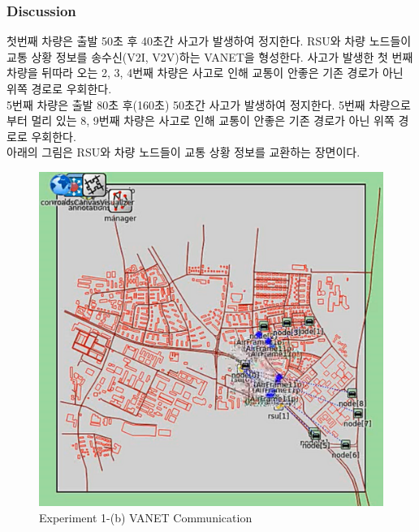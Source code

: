         \subsubsection*{Discussion}
            첫번째 차량은 출발 50초 후 40초간 사고가 발생하여 정지한다. RSU와 차량 노드들이 교통 상황 정보를 송수신(V2I, V2V)하는 VANET을 형성한다. 사고가 발생한 첫 번째 차량을 뒤따라 오는 2, 3, 4번째 차량은 사고로 인해 교통이 안좋은 기존 경로가 아닌 위쪽 경로로 우회한다. \\
            5번째 차량은 출발 80초 후(160초) 50초간 사고가 발생하여 정지한다. 5번째 차량으로부터 멀리 있는 8, 9번째 차량은 사고로 인해 교통이 안좋은 기존 경로가 아닌 위쪽 경로로 우회한다. \\
            아래의 그림은 RSU와 차량 노드들이 교통 상황 정보를 교환하는 장면이다. \\
            \begin{figure}[!h]\centering 
                \includegraphics[width=.50\textwidth]{image/week13/2-6.png}
                \caption{\footnotesize
                Experiment 1-(b) VANET Communication}
                \vspace{-10pt}
            \end{figure}